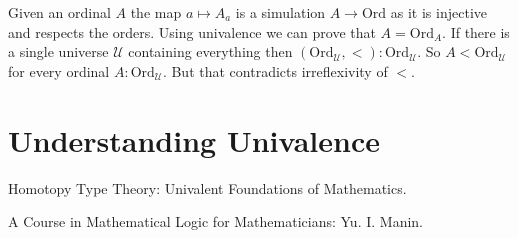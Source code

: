 \documentclass[10pt]{article}
\theoremstyle{definition}
\theoremstyle{plain}
\theoremstyle{remark}
\newcommand{\U}{\mathscr{U}}
\begin{document}
Given an ordinal $A$ the map $a \mapsto A_a$ is a simulation $A \to \text{Ord}$ as it is 
injective and respects the orders. Using univalence we can prove that $A = \text{Ord}_A$. 
If there is a single universe $\U$ containing everything then 
$(\text{Ord}_{\U},<) : \text{Ord}_{\U}$. So $A < \text{Ord}_{\U}$ for every ordinal 
$A : \text{Ord}_{\U}$. But that contradicts irreflexivity of $<$.

\section{Understanding Univalence}

\begin{thebibliography}{99}

Homotopy Type Theory: Univalent Foundations of Mathematics.

A Course in Mathematical Logic for Mathematicians: Yu. I. Manin. 

\end{thebibliography}
\end{document}
